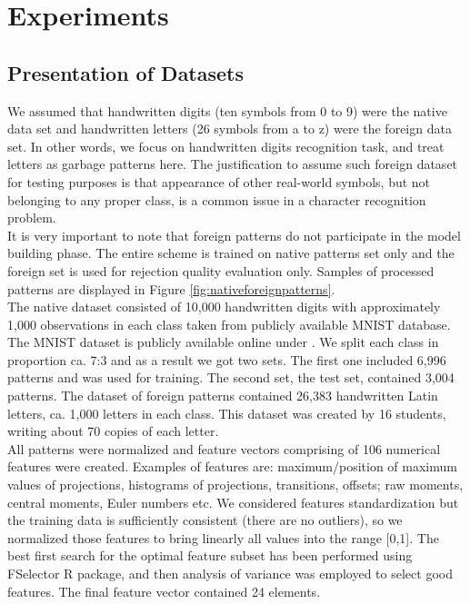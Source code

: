 \documentclass{llncs}
\begin{document}
\section{Experiments}
  \label{sec:Experiments}

\subsection{Presentation of Datasets}
\vspace{-3pt}

We assumed that handwritten digits (ten symbols from 0 to 9) were the native data set and handwritten letters (26 symbols from a to z) were the foreign data set. In other words, we focus on handwritten digits recognition task, and treat letters as garbage patterns here.  The justification to assume such foreign dataset for testing purposes is that appearance of other real-world symbols, but not belonging to any proper class, is a common issue in a character recognition problem. \\

It is very important to note that foreign patterns do not participate in the model building phase. The entire scheme is trained on native patterns set only and the foreign set is used for rejection quality evaluation only. Samples of processed patterns are displayed in Figure \ref{fig:nativeforeignpatterns}. \\

The native dataset consisted of 10,000 handwritten digits with approximately 1,000 observations in each class taken from publicly available MNIST database. The MNIST dataset is publicly available online under \cite{LeCunCortesBurges}. We split each class in proportion ca. 7:3 and as a result we got two sets. The first one included 6,996 patterns and was used for training. The second set, the test set, contained 3,004 patterns. The dataset of foreign patterns contained 26,383 handwritten Latin letters, ca. 1,000 letters in each class. This dataset was created by 16 students, writing about 70 copies of each letter. \\

All patterns were normalized and feature vectors comprising of 106 numerical features were created. Examples of features are: maximum/position of maximum values of projections, histograms of projections, transitions, offsets; raw moments, central moments, Euler numbers etc. We considered features standardization but the training data is sufficiently consistent (there are no outliers), so we normalized those features to bring linearly all values into the range [0,1]. The best first search for the optimal feature subset has been performed using FSelector R package, \cite{Romanski} and then analysis of variance was employed to select good features. The final feature vector contained 24 elements. 
\end{document}
